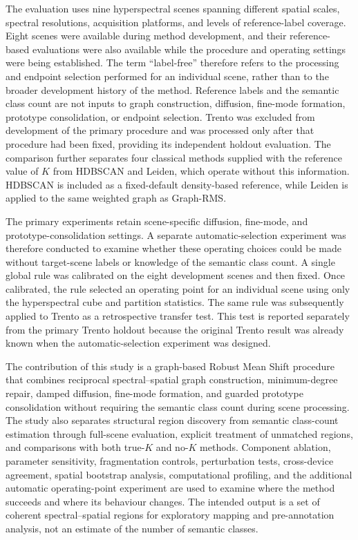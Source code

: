 \documentclass[10pt,a4paper,fleqn]{article}
\begin{document}
The evaluation uses nine hyperspectral scenes spanning different spatial
scales, spectral resolutions, acquisition platforms, and levels of
reference-label coverage. Eight scenes were available during method
development, and their reference-based evaluations were also available while
the procedure and operating settings were being established. The term
``label-free'' therefore refers to the processing and endpoint selection
performed for an individual scene, rather than to the broader development
history of the method. Reference labels and the semantic class count are not
inputs to graph construction, diffusion, fine-mode formation, prototype
consolidation, or endpoint selection. Trento was excluded from development of
the primary procedure and was processed only after that procedure had been
fixed, providing its independent holdout evaluation. The comparison further
separates four classical methods supplied with the reference value of \(K\)
from HDBSCAN and Leiden, which operate without this information. HDBSCAN is
included as a fixed-default density-based reference, while Leiden is applied
to the same weighted graph as Graph-RMS.

The primary experiments retain scene-specific diffusion, fine-mode, and
prototype-consolidation settings. A separate automatic-selection experiment
was therefore conducted to examine whether these operating choices could be
made without target-scene labels or knowledge of the semantic class count. A
single global rule was calibrated on the eight development scenes and then
fixed. Once calibrated, the rule selected an operating point for an individual
scene using only the hyperspectral cube and partition statistics. The same
rule was subsequently applied to Trento as a retrospective transfer test. This
test is reported separately from the primary Trento holdout because the
original Trento result was already known when the automatic-selection
experiment was designed.

The contribution of this study is a graph-based Robust Mean Shift procedure
that combines reciprocal spectral--spatial graph construction,
minimum-degree repair, damped diffusion, fine-mode formation, and guarded
prototype consolidation without requiring the semantic class count during
scene processing. The study also separates structural
region discovery from semantic class-count estimation through full-scene
evaluation, explicit treatment of unmatched regions, and comparisons with both
true-\(K\) and no-\(K\) methods. Component ablation, parameter sensitivity,
fragmentation controls, perturbation tests, cross-device agreement, spatial
bootstrap analysis, computational profiling, and the additional automatic
operating-point experiment are used to examine where the method succeeds and
where its behaviour changes. The intended output is a set of coherent
spectral--spatial regions for exploratory mapping and pre-annotation analysis,
not an estimate of the number of semantic classes.
\end{document}
